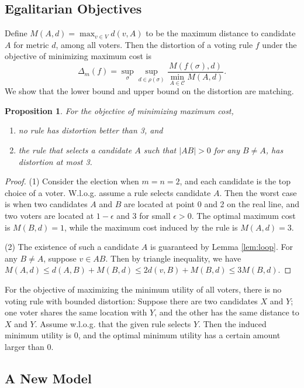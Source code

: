 \documentclass[11pt]{article}
\newtheorem{proposition}[theorem]{Proposition}
\theoremstyle{remark}
\begin{document}
\subsection{Egalitarian Objectives}

Define $M(A,d)=\max_{v\in V}d(v,A)$ to be the maximum distance to candidate $A$ for metric $d$, among all voters. Then the distortion of a voting rule $f$ under the objective of minimizing maximum cost is
$$ \Delta_m(f) = \sup_{\sigma}\sup_{d\in \rho(\sigma)} \frac{M(f(\sigma), d)}{\min_{A\in \mathcal C}M(A,d)}.$$
We show that the lower bound and upper bound on the distortion are matching.

\begin{proposition}
For the objective of minimizing maximum cost,
\begin{enumerate}
 \item no rule has distortion better than 3, and
  \item the rule that selects a candidate $A$ such that $|AB|>0$ for any $B\ne A$, has distortion at most 3.
  \end{enumerate}
 \end{proposition}

\begin{proof}
(1) Consider the election when $m=n=2$, and each candidate is the top choice of a voter. W.l.o.g. assume a rule selects candidate $A$. Then the worst case is when two candidates $A$ and $B$ are located at point 0 and 2 on the real line, and two voters are located at $1-\epsilon$ and 3 for small $\epsilon>0$. The optimal maximum cost is $M(B,d)=1$, while the maximum cost induced by the rule is $M(A,d)=3$.

(2) The existence of such a candidate $A$ is guaranteed by Lemma \ref{lem:loop}. For any $B\neq A$, suppose $v\in AB$. Then by triangle inequality, we have $M(A,d)\le d(A,B)+M(B,d)\le 2d(v,B)+M(B,d)\le 3M(B,d)$.
\end{proof}

For the objective of maximizing the minimum utility of all voters, there is no voting rule with bounded distortion: Suppose there are two candidates $X$ and $Y$; one voter shares the same location with $Y$, and the other has the same distance to $X$ and $Y$. Assume w.l.o.g. that the given rule selects $Y$. Then the induced minimum utility is 0, and the optimal minimum utility has a certain amount larger than 0.

\subsection{A New Model}
\end{document}
